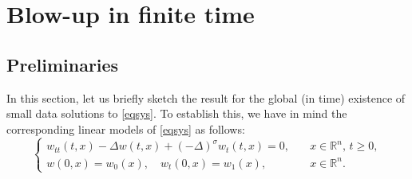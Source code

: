 \documentclass[11pt,reqno]{amsart}
\numberwithin{equation}{section}
\theoremstyle{plain}
\begin{document}
\section{Blow-up in finite time}
\subsection{Preliminaries}
In this section, let us briefly sketch the result for the global (in time) existence of small data solutions to \eqref{eqsys}. To establish this, we have in mind the corresponding linear models of \eqref{eqsys} as follows:
\begin{equation}\label{eqlin}
\begin{cases}
    w_{tt}(t,x) -\Delta w(t,x) +(-\Delta)^{\sigma}w_t(t,x)=0, \quad &x\in \mathbb{R}^n,\, t\geq 0,\\
    w(0,x)=w_0(x), \quad w_t(0,x)=w_1(x) ,\quad &x\in \mathbb{R}^n.
\end{cases}
\end{equation}
\end{document}

